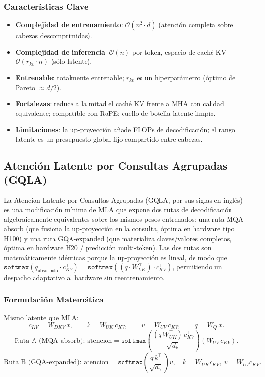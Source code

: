 \subsubsection{Características Clave}
\begin{itemize}[leftmargin=*]
    \item \textbf{Complejidad de entrenamiento}: $\mathcal{O}(n^2 \cdot d)$ (atención completa sobre cabezas descomprimidas).
    \item \textbf{Complejidad de inferencia}: $\mathcal{O}(n)$ por token, espacio de caché KV $\mathcal{O}(r_{kv} \cdot n)$ (sólo latente).
    \item \textbf{Entrenable}: totalmente entrenable; $r_{kv}$ es un hiperparámetro (óptimo de Pareto $\approx d/2$).
    \item \textbf{Fortalezas}: reduce a la mitad el caché KV frente a MHA con calidad equivalente; compatible con RoPE; cuello de botella latente limpio.
    \item \textbf{Limitaciones}: la up-proyección añade FLOPs de decodificación; el rango latente es un presupuesto global fijo compartido entre cabezas.
\end{itemize}

\subsection{Atención Latente por Consultas Agrupadas (GQLA)}
La Atención Latente por Consultas Agrupadas (GQLA, por sus siglas en inglés) \citep{meng_gqla_2026} es una modificación mínima de MLA que expone dos rutas de decodificación algebraicamente equivalentes sobre los mismos pesos entrenados: una ruta MQA-absorb (que fusiona la up-proyección en la consulta, óptima en hardware tipo H100) y una ruta GQA-expanded (que materializa claves/valores completos, óptima en hardware H20 / predicción multi-token). Las dos rutas son matemáticamente idénticas porque la up-proyección es lineal, de modo que $\texttt{softmax}(q_{\text{absorbido}} \cdot c_{KV}^\top) = \texttt{softmax}((q \cdot W_{UK}^\top) \cdot c_{KV}^\top)$, permitiendo un despacho adaptativo al hardware sin reentrenamiento.

\subsubsection{Formulación Matemática}
Mismo latente que MLA:
\[
c_{KV} = W_{DKV}\, x, \qquad k = W_{UK}\, c_{KV}, \qquad v = W_{UV}\, c_{KV}, \qquad q = W_{Q}\, x.
\]
\[
\text{Ruta A (MQA-absorb): } \text{atencion} = \texttt{softmax}\!\left(\frac{(q\, W_{UK}^\top)\, c_{KV}^\top}{\sqrt{d_h}}\right) (W_{UV}\, c_{KV}).
\]
\[
\text{Ruta B (GQA-expanded): } \text{atencion} = \texttt{softmax}\!\left(\frac{q\, k^\top}{\sqrt{d_h}}\right) v, \quad k = W_{UK} c_{KV},\ v = W_{UV} c_{KV}.
\]

